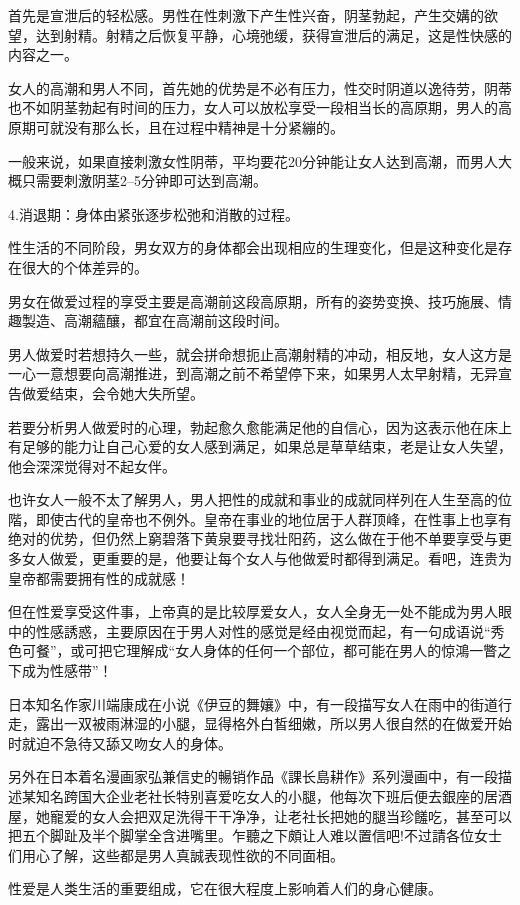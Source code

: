 \documentclass[12pt,UTF8]{ctexbook}
\begin{document}
首先是宣泄后的轻松感。男性在性刺激下产生性兴奋，阴茎勃起，产生交媾的欲望，达到射精。射精之后恢复平静，心境弛缓，获得宣泄后的满足，这是性快感的内容之一。

女人的高潮和男人不同，首先她的优势是不必有压力，性交时阴道以逸待劳，阴蒂也不如阴茎勃起有时间的压力，女人可以放松享受一段相当长的高原期，男人的高原期可就没有那么长，且在过程中精神是十分紧繃的。

一般来说，如果直接刺激女性阴蒂，平均要花20分钟能让女人达到高潮，而男人大概只需要刺激阴茎2--5分钟即可达到高潮。

4.消退期：身体由紧张逐步松弛和消散的过程。

性生活的不同阶段，男女双方的身体都会出现相应的生理变化，但是这种变化是存在很大的个体差异的。

男女在做爱过程的享受主要是高潮前这段高原期，所有的姿势变换、技巧施展、情趣製造、高潮蘊釀，都宜在高潮前这段时间。

男人做爱时若想持久一些，就会拼命想扼止高潮射精的冲动，相反地，女人这方是一心一意想要向高潮推进，到高潮之前不希望停下来，如果男人太早射精，无异宣告做爱结束，会令她大失所望。

若要分析男人做爱时的心理，勃起愈久愈能满足他的自信心，因为这表示他在床上有足够的能力让自己心爱的女人感到满足，如果总是草草结束，老是让女人失望，他会深深觉得对不起女伴。

也许女人一般不太了解男人，男人把性的成就和事业的成就同样列在人生至高的位階，即使古代的皇帝也不例外。皇帝在事业的地位居于人群顶峰，在性事上也享有绝对的优势，但仍然上窮碧落下黄泉要寻找壮阳药，这么做在于他不单要享受与更多女人做爱，更重要的是，他要让每个女人与他做爱时都得到满足。看吧，连贵为皇帝都需要拥有性的成就感！

但在性爱享受这件事，上帝真的是比较厚爱女人，女人全身无一处不能成为男人眼中的性感誘惑，主要原因在于男人对性的感觉是经由视觉而起，有一句成语说“秀色可餐”，或可把它理解成“女人身体的任何一个部位，都可能在男人的惊鴻一瞥之下成为性感带”！

日本知名作家川端康成在小说《伊豆的舞孃》中，有一段描写女人在雨中的街道行走，露出一双被雨淋湿的小腿，显得格外白皙细嫩，所以男人很自然的在做爱开始时就迫不急待又舔又吻女人的身体。

另外在日本着名漫画家弘兼信史的暢销作品《課长島耕作》系列漫画中，有一段描述某知名跨国大企业老社长特别喜爱吃女人的小腿，他每次下班后便去銀座的居酒屋，她寵爱的女人会把双足洗得干干净净，让老社长把她的腿当珍饈吃，甚至可以把五个脚趾及半个脚掌全含进嘴里。乍聽之下頗让人难以置信吧!不过請各位女士们用心了解，这些都是男人真誠表现性欲的不同面相。

性爱是人类生活的重要组成，它在很大程度上影响着人们的身心健康。
\end{document}

